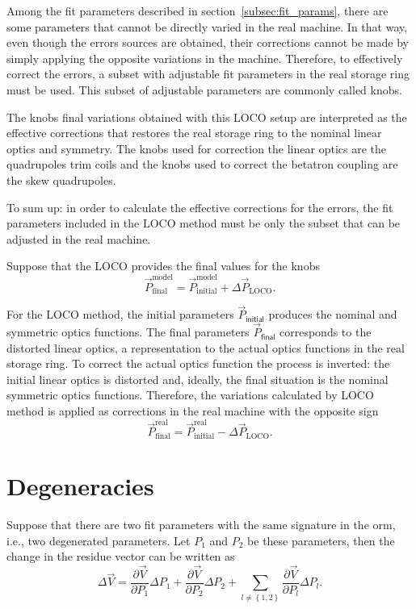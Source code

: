 Among the fit parameters described in section~\ref{subsec:fit_params}, there are some parameters that cannot be directly varied in the real machine. In that way, even though the errors sources are obtained, their corrections cannot be made by simply applying the opposite variations in the machine. Therefore, to effectively correct the errors, a subset with adjustable fit parameters in the real storage ring must be used. This subset of adjustable parameters are commonly called knobs.

The knobs final variations obtained with this LOCO setup are interpreted as the effective corrections that restores the real storage ring to the nominal linear optics and symmetry. The knobs used for correction the linear optics are the quadrupoles trim coils and the knobs used to correct the betatron coupling are the skew quadrupoles. 

To sum up: in order to calculate the effective corrections for the errors, the fit parameters included in the LOCO method must be only the subset that can be adjusted in the real machine.

Suppose that the LOCO provides the final values for the knobs
\begin{equation}
    \vec{P}_{\mathrm{final}}^{\mathrm{model}} = \vec{P}_{\mathrm{initial}}^{\mathrm{model}} + \Delta\vec{P}_{\mathrm{LOCO}}.
\end{equation}

For the LOCO method, the initial parameters $\vec{P}_{\mathsf{initial}}$ produces the nominal and symmetric optics functions. The final parameters $\vec{P}_{\mathsf{final}}$ corresponds to the distorted linear optics, a representation to the actual optics functions in the real storage ring. To correct the actual optics function the process is inverted: the initial linear optics is distorted and, ideally, the final situation is the nominal symmetric optics functions. Therefore, the variations calculated by LOCO method is applied as corrections in the real machine with the opposite sign
\begin{equation}
    \vec{P}_{\mathrm{final}}^{\mathrm{real}} = \vec{P}_{\mathrm{initial}}^{\mathrm{real}} - \Delta\vec{P}_{\mathrm{LOCO}}.
\end{equation}
\section{Degeneracies}\label{sec:degeneracy}
Suppose that there are two fit parameters with the same signature in the \gls{orm}, i.e., two degenerated parameters. Let $P_1$ and $P_2$ be these parameters, then the change in the residue vector can be written as
\begin{equation}
\Delta \vec{V} = \dfrac{\partial \vec{V}}{\partial P_{1}} \Delta P_{1} + \dfrac{\partial \vec{V}}{\partial P_{2}} \Delta P_{2} + \sum_{l \neq \left\{1,2\right\}}\dfrac{\partial \vec{V}}{\partial P_{l}} \Delta P_{l}.
\end{equation}

